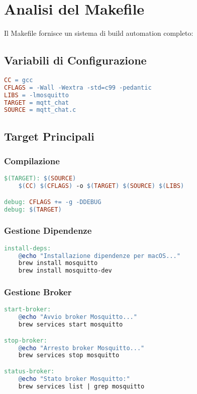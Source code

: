 \documentclass[12pt,a4paper]{article}
\begin{document}
\section{Analisi del Makefile}

Il Makefile fornisce un sistema di build automation completo:

\subsection{Variabili di Configurazione}

\begin{lstlisting}[language=make, caption=Configurazione Build]
CC = gcc
CFLAGS = -Wall -Wextra -std=c99 -pedantic
LIBS = -lmosquitto
TARGET = mqtt_chat
SOURCE = mqtt_chat.c
\end{lstlisting}

\subsection{Target Principali}

\subsubsection{Compilazione}
\begin{lstlisting}[language=make]
$(TARGET): $(SOURCE)
	$(CC) $(CFLAGS) -o $(TARGET) $(SOURCE) $(LIBS)

debug: CFLAGS += -g -DDEBUG
debug: $(TARGET)
\end{lstlisting}

\subsubsection{Gestione Dipendenze}
\begin{lstlisting}[language=make]
install-deps:
	@echo "Installazione dipendenze per macOS..."
	brew install mosquitto
	brew install mosquitto-dev
\end{lstlisting}

\subsubsection{Gestione Broker}
\begin{lstlisting}[language=make]
start-broker:
	@echo "Avvio broker Mosquitto..."
	brew services start mosquitto

stop-broker:
	@echo "Arresto broker Mosquitto..."
	brew services stop mosquitto

status-broker:
	@echo "Stato broker Mosquitto:"
	brew services list | grep mosquitto
\end{lstlisting}
\end{document}

